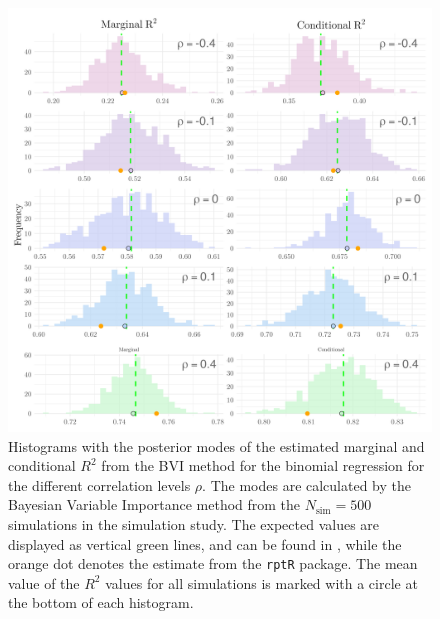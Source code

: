 \begin{figure}[H]
  \centering
  \includegraphics[width=1\linewidth]{Figures/Simulation study/R2_combined_poisson.png}
  \caption[Marginal and conditional $R^2$ in Poisson GLMM]{Histograms with the posterior modes of the estimated marginal and conditional $R^2$ from the BVI method for the binomial regression for the different correlation levels $\rho$. The modes are calculated by the Bayesian Variable Importance method from the $N_{\text{sim}}=500$ simulations in the simulation study. The expected values are displayed as vertical green lines, and can be found in , while the orange dot denotes the estimate from the \texttt{rptR} package. The mean value of the $R^2$ values for all simulations is marked with a circle at the bottom of each histogram.}
  \label{fig:r2_combined_poisson}
\end{figure}
